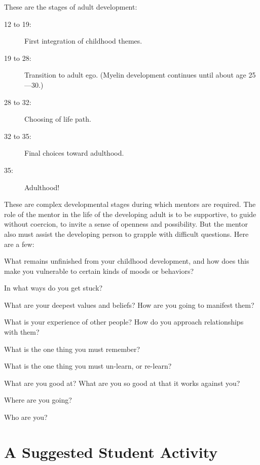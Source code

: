 \documentclass[12pt,DIV9,oneside,headsepline,footsepline]{scrreprt}
\begin{document}
These are the stages of adult development:

\begin{description}
\item[12 to 19:] First integration of childhood themes.
\item[19 to 28:] Transition to adult ego. (Myelin development
  continues until about age 25---30.)
\item[28 to 32:] Choosing of life path.
\item[32 to 35:] Final choices toward adulthood.
\item[35:] Adulthood!
\end{description}

These are complex developmental stages during which mentors are
required. The role of the mentor in the life of the developing adult
is to be supportive, to guide without coercion, to invite a sense of
openness and possibility. But the mentor also must assist the
developing person to grapple with difficult questions. Here are a few:

\begin{list}{}{}
\item What remains unfinished from your childhood development, and how
does this make you vulnerable to certain kinds of moods or behaviors?
\item In what ways do you get stuck?
\item What are your deepest values and beliefs? How are you going to
manifest them?
\item What is your experience of other people? How do you approach
relationships with them?
\item What is the one thing you must remember?
\item What is the one thing you must un-learn, or re-learn?
\item What are you good at? What are you so good at that it works
against you?
\item Where are you going?
\item Who are you?
\end{list}

\section{A Suggested Student Activity}
\end{document}
